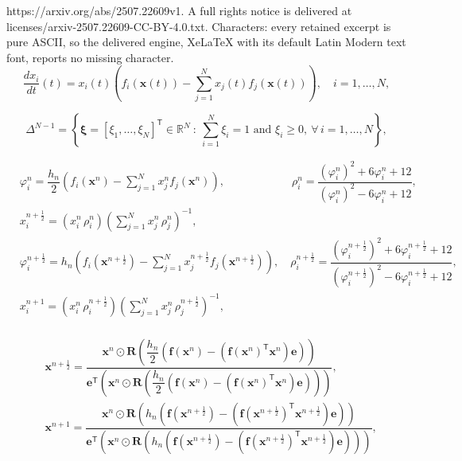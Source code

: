 \documentclass[10pt,a4paper]{amsart}
\begin{document}
https://arxiv.org/abs/2507.22609v1. A full rights notice is delivered at licenses/arxiv-2507.22609-CC-BY-4.0.txt. Characters: every retained excerpt is pure ASCII, so the delivered engine, XeLaTeX with its default Latin Modern text font, reports no missing character.
\begin{equation}\label{eq:replicator}
  \frac{dx_i}{dt}(t) = x_i(t)\left( f_i(\bm{x}(t)) - \sum_{j=1}^{N} x_j(t) f_j(\bm{x}(t)) \right),\quad i=1,\dots,N,
\end{equation}

    \begin{equation}\label{eq:simplex_def}
        \Delta^{N-1} = \left\{\bm{\xi}=[\xi_1,\dots,\xi_N]^\mathsf{T}\in\mathbb{R}^N \ :  \ \sum_{i=1}^{N}\xi_i = 1 \text{ and } \xi_i\ge 0, \ \forall \, i=1,\dots,N \right\},
    \end{equation}

\begin{equation}\label{eq:Rational_Integrator}
    \begin{split}
        &\varphi_i^n=\dfrac{h_n}{2} \left( f_i(\bm{x}^n) - \sum_{j=1}^{N} x_j^n f_j(\bm{x}^n) \right), \qquad  \qquad \qquad 
        \rho_i^n =\dfrac{(\varphi_i^n)^2+6\varphi_i^n+12}{(\varphi_i^n)^2-6\varphi_i^n+12},\\
        &x_i^{n+\frac{1}{2}}= (x_i^n \, \rho_i^n)\left(\displaystyle\sum_{j=1}^N x_j^n \, \rho_j^n\right)^{-1}, \\
        &\varphi_i^{n+\frac{1}{2}}=h_n \left( f_i(\bm{x}^{n+\frac{1}{2}}) - \sum_{j=1}^{N} x_j^{n+\frac{1}{2}} f_j(\bm{x}^{n+\frac{1}{2}}) \right), \quad
        \rho_i^{n+\frac{1}{2}}=\dfrac{(\varphi_i^{n+\frac{1}{2}})^2+6\varphi_i^{n+\frac{1}{2}}+12}{(\varphi_i^{n+\frac{1}{2}})^2-6\varphi_i^{n+\frac{1}{2}}+12},\\
        &x_i^{n+1}= (x_i^{n} \, \rho_i^{n+\frac{1}{2}})\left(\displaystyle\sum_{j=1}^N x_j^{n} \, \rho_j^{n+\frac{1}{2}}\right)^{-1}, \\
    \end{split}
\end{equation}

\begin{equation}\label{eq:Compact_Rational_Integrator}
    \begin{split}
        &\bm{x}^{n+\frac{1}{2}} = \dfrac{ \bm{x}^n \odot \bm{R}\left(\dfrac{h_n}{2} \left( \bm{f}(\bm{x}^n) - \left(\bm{f}(\bm{x}^n)^\mathsf{T}\bm{x}^n \right) \bm{e} \right)\right) }{ \bm{e}^{\mathsf{T}} \left( \bm{x}^n \odot \bm{R}\left(\dfrac{h_n}{2} \left( \bm{f}(\bm{x}^n) - \left(\bm{f}(\bm{x}^n)^\mathsf{T}\bm{x}^n \right) \bm{e} \right)\right) \right) }, \\[1.2ex]
        &\bm{x}^{n+1} = \dfrac{ \bm{x}^{n} \odot \bm{R} \left( h_n \left( \bm{f}(\bm{x}^{n+\frac{1}{2}}) - \left( \bm{f}(\bm{x}^{n+\frac{1}{2}})^{\mathsf{T}} \bm{x}^{n+\frac{1}{2}} \right) \bm{e} \right) \right) }{ \bm{e}^{\mathsf{T}}  \left( \bm{x}^{n} \odot \bm{R} \left( h_n \left( \bm{f}(\bm{x}^{n+\frac{1}{2}}) - \left( \bm{f}(\bm{x}^{n+\frac{1}{2}})^{\mathsf{T}} \bm{x}^{n+\frac{1}{2}} \right) \bm{e} \right) \right) \right) },
    \end{split}
\end{equation}
\end{document}
